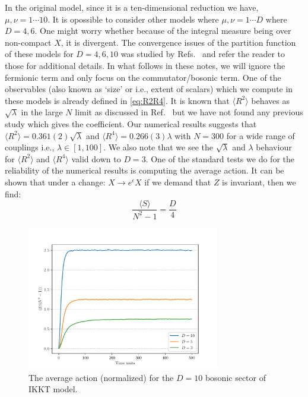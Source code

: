 \documentclass[11pt]{article}
\begin{document}
In the original model, since it is a ten-dimensional reduction we have, $\mu, \nu = 1 \cdots 10$. 
It is opossible to consider other models where $\mu, \nu = 1 \cdots D$ where $D=4,6$. 
One might worry whether because of the integral measure being over non-compact $X$, 
it is divergent. The convergence issues of the partition function of 
these models for $D=4,6,10$ was studied by Refs.~\cite{Krauth:1998yu,Krauth:1999qw} and 
refer the reader to those for additional details.  
In what follows in these notes, we will ignore the fermionic 
term and only focus on the commutator/bosonic term. 
One of the observables (also known as `size' or i.e., extent of scalars) 
which we compute in these models is already defined in \ref{eq:R2R4}. 
It is known that $\langle R^2 \rangle$ behaves as $\sqrt{\lambda}$ in the large $N$ limit 
as discussed in Ref.~\cite{Hotta:1998en} but we have not found any previous study
which gives the coefficient. Our numerical results suggests 
that $ \langle R^2 \rangle = 0.361(2) \sqrt{\lambda}$ 
and $ \langle R^4 \rangle = 0.266(3) \lambda$ with $N = 300$ for a wide range of couplings i.e., 
$\lambda \in [1,100]$. We also note that we see the $\sqrt{\lambda}$ and $\lambda$ behaviour for 
$\langle R^2 \rangle$ and $\langle R^4 \rangle$ valid down to $D=3$. 
One of the standard tests we do for the reliability of the numerical results is 
computing the average action. It can be shown that under a 
change: $X \to e^{\epsilon} X$ if we demand that $Z$ is invariant, 
then we find:
\begin{equation}
\label{eq:SD_IKKT1} 
	\frac{\langle S \rangle}{N^2 - 1} = \frac{D}{4} 
\end{equation}
\begin{figure}[htbp] 
	\centering 
	\includegraphics[width=0.75\textwidth]{figs/act_allD_YM.pdf}
	\caption{\label{fig:IKKT_2}The average action (normalized) for the $D=10$ bosonic sector of IKKT model.}
\end{figure}
\end{document}
